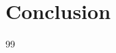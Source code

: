\documentclass[runningheads]{llncs}
\begin{document}

\section{Conclusion}
\label{sec:conclusion}


\begin{thebibliography}{99}
\end{thebibliography}
\end{document}
